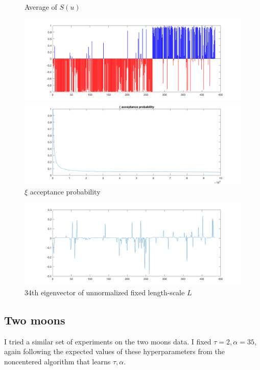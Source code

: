 \documentclass{siamart1116}
\begin{document}
\begin{figure}[!htb]
\begin{minipage}{0.48\textwidth}
    \centering
    \caption{\label{fig:voting_hier_u_avg} Average of $S(u)$}
    \includegraphics[width=\linewidth]{voting/hier/u_avg.png}
\end{minipage} \hfill
\begin{minipage}{0.48\textwidth}
    \centering
    \caption{\label{fig:voting_hier_xi_accept} $\xi$ acceptance probability}
    \includegraphics[width=\linewidth]{voting/hier/xi_accept.png}
\end{minipage}
\end{figure}

\begin{figure}[!htb]
\caption{\label{fig:voting_hier_eigenvector} 34th eigenvector of unnormalized fixed length-scale $L$}
\includegraphics[width=\linewidth]{voting/hier/34_eigvec.png}
\end{figure}

\subsection{Two moons}
I tried a similar set of experiments on the two moons data. I fixed $\tau = 2, \alpha = 35$, again following the expected values of these hyperparameters from the noncentered algorithm that learns $\tau,\alpha$. 



\end{document}

